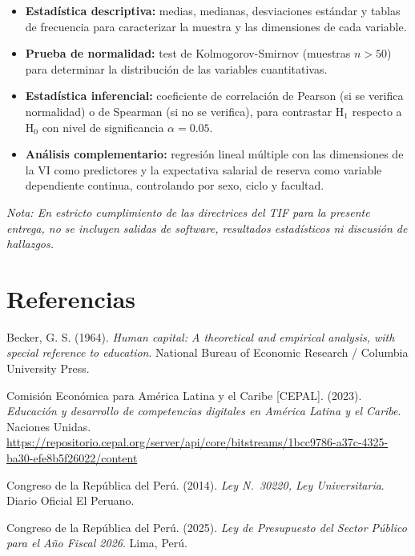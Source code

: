 \documentclass[11pt, a4paper]{article}
\begin{document}
\begin{itemize}
    \item \textbf{Estadística descriptiva:} medias, medianas, desviaciones estándar y tablas de frecuencia para caracterizar la muestra y las dimensiones de cada variable.
    \item \textbf{Prueba de normalidad:} test de Kolmogorov-Smirnov (muestras $n > 50$) para determinar la distribución de las variables cuantitativas.
    \item \textbf{Estadística inferencial:} coeficiente de correlación de Pearson (si se verifica normalidad) o de Spearman (si no se verifica), para contrastar H$_1$ respecto a H$_0$ con nivel de significancia $\alpha = 0.05$.
    \item \textbf{Análisis complementario:} regresión lineal múltiple con las dimensiones de la VI como predictores y la expectativa salarial de reserva como variable dependiente continua, controlando por sexo, ciclo y facultad.
\end{itemize}

\textit{Nota: En estricto cumplimiento de las directrices del TIF para la presente entrega, no se incluyen salidas de software, resultados estadísticos ni discusión de hallazgos.}

\section*{Referencias}

\noindent\hangindent=1.27cm
Becker, G. S. (1964). \textit{Human capital: A theoretical and empirical analysis, with special reference to education}. National Bureau of Economic Research / Columbia University Press.

\vspace{0.2cm}
\noindent\hangindent=1.27cm
Comisión Económica para América Latina y el Caribe [CEPAL]. (2023). \textit{Educación y desarrollo de competencias digitales en América Latina y el Caribe}. Naciones Unidas. \url{https://repositorio.cepal.org/server/api/core/bitstreams/1bcc9786-a37c-4325-ba30-efe8b5f26022/content}

\vspace{0.2cm}
\noindent\hangindent=1.27cm
Congreso de la República del Perú. (2014). \textit{Ley N.\textdegree~30220, Ley Universitaria}. Diario Oficial El Peruano.

\vspace{0.2cm}
\noindent\hangindent=1.27cm
Congreso de la República del Perú. (2025). \textit{Ley de Presupuesto del Sector Público para el Año Fiscal 2026}. Lima, Perú.
\end{document}
